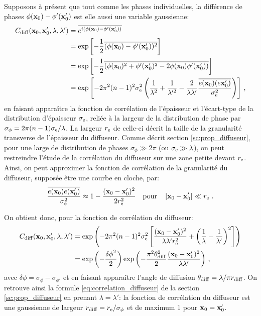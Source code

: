Supposons à présent que tout comme les phases individuelles, la différence de phases $\phi(\mathbf{x}_0)-\phi'(\mathbf{x}_0')$ est elle aussi une variable gaussienne:
\begin{align}
C_{\mathrm{diff}}(\mathbf{x}_0,\mathbf{x}_0',\lambda,\lambda') &= \overline{e^{i(\phi(\mathbf{x}_0) - \phi'(\mathbf{x}_0'))}} \\
&= \exp{\left[-\frac{1}{2} \overline{(\phi(\mathbf{x}_0)-\phi'(\mathbf{x}_0'))^2}\right]} \\
&= \exp{\left[ -\frac{1}{2} \overline{(\phi(\mathbf{x}_0)^2 + \phi'(\mathbf{x}_0')^2 -2 \phi(\mathbf{x}_0) \phi'(\mathbf{x}_0'))} \right] } \\
&= \exp{\left[-2\pi^2 (n-1)^2 \sigma_{\mathrm{e}}^2 \left( \frac{1}{\lambda^2} + \frac{1}{\lambda'^2} - \frac{2}{\lambda\lambda'} \frac{\overline{e(\mathbf{x}_0)(e\mathbf{x}_0')}}{\sigma_{\mathrm{e}}^2}\right)\right]} \text{ ,}
\end{align}
en faisant apparaître la fonction de corrélation de l'épaisseur et l'écart-type de la distribution d'épaisseur $\sigma_{\mathrm{e}}$, reliée à la largeur de la distribution de phase par $\sigma_{\phi} = 2\pi (n-1) \sigma_{\mathrm{e}} /\lambda$. La largeur $r_{\mathrm{e}}$ de celle-ci décrit la taille de la granularité transverse de l'épaisseur du diffuseur. Comme décrit section \ref{sc:prop_diffuseur}, pour une large de distribution de phases $\sigma_{\phi} \gg 2\pi$ (ou $\sigma_{\mathrm{e}} \gg \lambda$), on peut restreindre l'étude de la corrélation du diffuseur sur une zone petite devant $r_{\mathrm{e}}$. Ainsi, on peut approximer la fonction de corrélation de la granularité du diffuseur, supposée être une courbe en cloche, par:
\begin{equation}
\frac{\overline{e(\mathbf{x}_0)e(\mathbf{x}_0')}}{\sigma_{\mathrm{e}}^2}\approx 1- \frac{(\mathbf{x}_0 - \mathbf{x}_0')^2}{2r_{\mathrm{e}}^2} \quad \text{pour} \quad \left| \mathbf{x}_0-\mathbf{x}_0' \right| \ll r_{\mathrm{e}} \text{ .}
\end{equation}

On obtient donc, pour la fonction de corrélation du diffuseur:
\begin{align}
C_{\mathrm{diff}}(\mathbf{x}_0,\mathbf{x}_0',\lambda,\lambda') &= \exp{\left( -2 \pi^2 (n-1)^2 \sigma_{\mathrm{e}}^2 \left[ \frac{(\mathbf{x}_0- \mathbf{x}_0')^2}{\lambda \lambda' r_{\mathrm{e}}^2} + \left( \frac{1}{\lambda} - \frac{1}{\lambda'} \right)^2 \right] \right)} \\
&= \exp{\left(-\frac{{\delta\phi}^2}{2}\right)} \exp{\left(-\frac{\pi^2 \theta_{\mathrm{diff}}^2}{2} \frac{(\mathbf{x}_0-\mathbf{x}_0')^2}{\lambda \lambda'}\right)} \text{ ,}
\end{align}
avec $\delta\phi=\sigma_{\phi} - \sigma_{\phi'}$ et en faisant apparaître l'angle de diffusion $\theta_{\mathrm{diff}}=\lambda /\pi r_{\mathrm{diff}}$. On retrouve ainsi la formule \ref{eq:correlation_diffuseur} de la section \ref{sc:prop_diffuseur} en prenant $\lambda=\lambda'$: la fonction de corrélation du diffuseur est une gaussienne de largeur $r_{\mathrm{diff}}=r_{\mathrm{e}}/\sigma_{\phi}$ et de maximum 1 pour $\mathbf{x}_0=\mathbf{x}_0'$.




